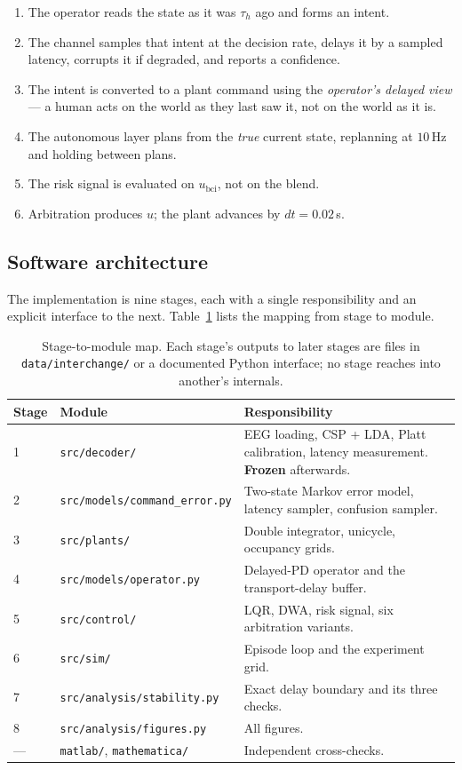 \documentclass[11pt,a4paper]{article}
\newcommand{\ubci}{u_{\mathrm{bci}}}
\theoremstyle{plain}
\theoremstyle{definition}
\begin{document}
\begin{enumerate}
\item The operator reads the state as it was $\tau_h$ ago and forms an intent.
\item The channel samples that intent at the decision rate, delays it by
      a sampled latency, corrupts it if degraded, and reports a confidence.
\item The intent is converted to a plant command using the
      \emph{operator's delayed view} --- a human acts on the world as they
      last saw it, not on the world as it is.
\item The autonomous layer plans from the \emph{true} current state,
      replanning at $10$\,Hz and holding between plans.
\item The risk signal is evaluated on $\ubci$, not on the blend.
\item Arbitration produces $u$; the plant advances by $dt = 0.02$\,s.
\end{enumerate}

\subsection{Software architecture}

The implementation is nine stages, each with a single responsibility and
an explicit interface to the next. Table~\ref{tab:layout} lists the
mapping from stage to module.

\begin{table}[htbp]
\centering
\small
\begin{tabular}{@{}llp{7.6cm}@{}}
\toprule
Stage & Module & Responsibility \\
\midrule
1 & \texttt{src/decoder/}   & EEG loading, CSP + LDA, Platt calibration,
                              latency measurement. \textbf{Frozen} afterwards. \\
2 & \texttt{src/models/command\_error.py} & Two-state Markov error model,
                              latency sampler, confusion sampler. \\
3 & \texttt{src/plants/}    & Double integrator, unicycle, occupancy grids. \\
4 & \texttt{src/models/operator.py} & Delayed-PD operator and the transport-delay buffer. \\
5 & \texttt{src/control/}   & LQR, DWA, risk signal, six arbitration variants. \\
6 & \texttt{src/sim/}       & Episode loop and the experiment grid. \\
7 & \texttt{src/analysis/stability.py} & Exact delay boundary and its three checks. \\
8 & \texttt{src/analysis/figures.py} & All figures. \\
--- & \texttt{matlab/}, \texttt{mathematica/} & Independent cross-checks. \\
\bottomrule
\end{tabular}
\caption{Stage-to-module map. Each stage's outputs to later stages are
files in \texttt{data/interchange/} or a documented Python interface;
no stage reaches into another's internals.}
\label{tab:layout}
\end{table}
\end{document}
